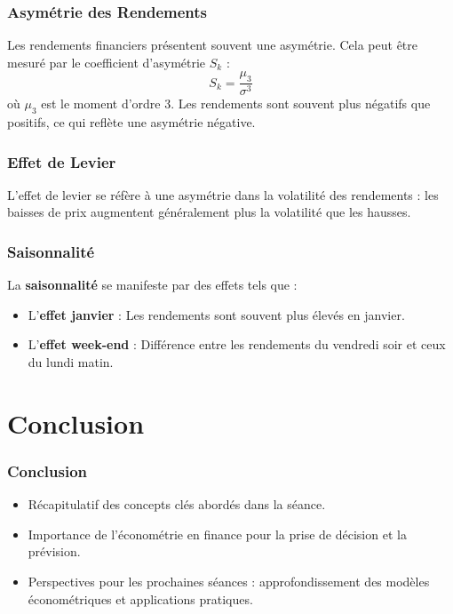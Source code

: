 \documentclass{beamer}
\begin{document}
\begin{frame}
  \frametitle{Asymétrie des Rendements}
  Les rendements financiers présentent souvent une asymétrie. Cela peut être mesuré par le coefficient d'asymétrie \( S_k \) :
  \[
    S_k = \frac{\mu_3}{\sigma^3}
  \]
  où \( \mu_3 \) est le moment d'ordre 3. Les rendements sont souvent plus négatifs que positifs, ce qui reflète une asymétrie négative.
\end{frame}

\begin{frame}
  \frametitle{Effet de Levier}
  L'effet de levier se réfère à une asymétrie dans la volatilité des rendements : les baisses de prix augmentent généralement plus la volatilité que les hausses.
\end{frame}

\begin{frame}
  \frametitle{Saisonnalité}
  La \textbf{saisonnalité} se manifeste par des effets tels que :
  \begin{itemize}
    \item L'\textbf{effet janvier} : Les rendements sont souvent plus élevés en janvier.
    \item L'\textbf{effet week-end} : Différence entre les rendements du vendredi soir et ceux du lundi matin.
  \end{itemize}
\end{frame}

\section{Conclusion}

\begin{frame}
  \frametitle{Conclusion}
  \begin{itemize}
    \item Récapitulatif des concepts clés abordés dans la séance.
    \item Importance de l'économétrie en finance pour la prise de décision et la prévision.
    \item Perspectives pour les prochaines séances : approfondissement des modèles économétriques et applications pratiques.
  \end{itemize}
\end{frame}
\end{document}
